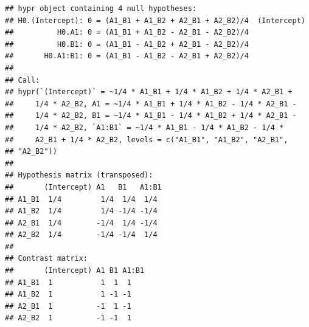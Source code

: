 \documentclass[
  12pt,
]{krantz}
\newenvironment{Shaded}{\begin{snugshade}}{\end{snugshade}}
\newcommand{\CommentTok}[1]{\textcolor[rgb]{0.56,0.35,0.01}{\textit{#1}}}
\newcommand{\DecValTok}[1]{\textcolor[rgb]{0.00,0.00,0.81}{#1}}
\newcommand{\FunctionTok}[1]{\textcolor[rgb]{0.00,0.00,0.00}{#1}}
\newcommand{\NormalTok}[1]{#1}
\newcommand{\OtherTok}[1]{\textcolor[rgb]{0.56,0.35,0.01}{#1}}
\newcommand{\SpecialCharTok}[1]{\textcolor[rgb]{0.00,0.00,0.00}{#1}}
\newcommand{\StringTok}[1]{\textcolor[rgb]{0.31,0.60,0.02}{#1}}
\theoremstyle{definition}
\theoremstyle{definition}
\theoremstyle{definition}
\theoremstyle{definition}
\theoremstyle{remark}
\begin{document}
\begin{Shaded}
\end{Shaded}

\begin{verbatim}
## hypr object containing 4 null hypotheses:
## H0.(Intercept): 0 = (A1_B1 + A1_B2 + A2_B1 + A2_B2)/4  (Intercept)
##          H0.A1: 0 = (A1_B1 + A1_B2 - A2_B1 - A2_B2)/4
##          H0.B1: 0 = (A1_B1 - A1_B2 + A2_B1 - A2_B2)/4
##       H0.A1:B1: 0 = (A1_B1 - A1_B2 - A2_B1 + A2_B2)/4
## 
## Call:
## hypr(`(Intercept)` = ~1/4 * A1_B1 + 1/4 * A1_B2 + 1/4 * A2_B1 + 
##     1/4 * A2_B2, A1 = ~1/4 * A1_B1 + 1/4 * A1_B2 - 1/4 * A2_B1 - 
##     1/4 * A2_B2, B1 = ~1/4 * A1_B1 - 1/4 * A1_B2 + 1/4 * A2_B1 - 
##     1/4 * A2_B2, `A1:B1` = ~1/4 * A1_B1 - 1/4 * A1_B2 - 1/4 * 
##     A2_B1 + 1/4 * A2_B2, levels = c("A1_B1", "A1_B2", "A2_B1", 
## "A2_B2"))
## 
## Hypothesis matrix (transposed):
##       (Intercept) A1   B1   A1:B1
## A1_B1  1/4         1/4  1/4  1/4 
## A1_B2  1/4         1/4 -1/4 -1/4 
## A2_B1  1/4        -1/4  1/4 -1/4 
## A2_B2  1/4        -1/4 -1/4  1/4 
## 
## Contrast matrix:
##       (Intercept) A1 B1 A1:B1
## A1_B1  1           1  1  1   
## A1_B2  1           1 -1 -1   
## A2_B1  1          -1  1 -1   
## A2_B2  1          -1 -1  1
\end{verbatim}
\end{document}

